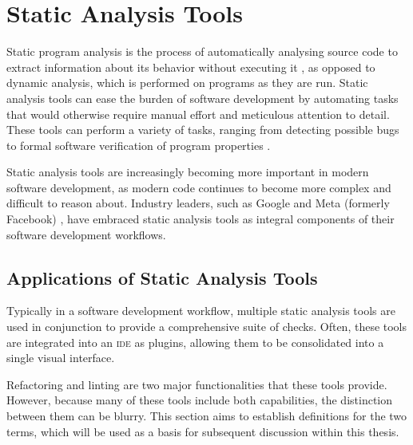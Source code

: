 \chapter{Static Analysis Tools}


Static program analysis is the process of automatically analysing source code to extract information about its behavior without executing it , as opposed to dynamic analysis, which is performed on programs as they are run.
Static analysis tools can ease the burden of software development by automating tasks that would otherwise require manual effort and meticulous attention to detail.
These tools can perform a variety of tasks, ranging from detecting possible bugs \cite{johnson_lint_1978,hovemeyer_finding-bugs_2004} to formal software verification of program properties \cite{blanchet_static-analyzer_2003}.

Static analysis tools are increasingly becoming more important in modern software development, as modern code continues to become more complex and difficult to reason about.
Industry leaders, such as Google \cite{sadowski_analysis-google_2018} and Meta (formerly Facebook) \cite{calcagno_moving-facebook_2015}, have embraced static analysis tools as integral components of their software development workflows.

\section{Applications of Static Analysis Tools}
Typically in a software development workflow, multiple static analysis tools are used in conjunction to provide a comprehensive suite of checks.
Often, these tools are integrated into an \textsc{ide} as plugins, allowing them to be consolidated into a single visual interface.

Refactoring and linting are two major functionalities that these tools provide.
However, because many of these tools include both capabilities, the distinction between them can be blurry.
This section aims to establish definitions for the two terms, which will be used as a basis for subsequent discussion within this thesis.

